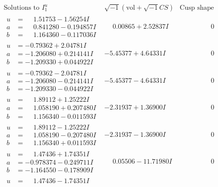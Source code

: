 \documentclass[1p]{elsarticle_modified}
\theoremstyle{definition}
\newcommand{\I}{\sqrt{-1}}
\begin{document}
$$\begin{array}{c|c|c}
\text{Solutions to }I^u_{1}& \I (\text{vol} + \sqrt{-1}CS) & \text{Cusp shape}\\
 \hline 
\begin{aligned}
u &= \phantom{-}1.51753 - 1.56254 I \\
a &= \phantom{-}0.841280 - 0.194857 I \\
b &= \phantom{-}1.164360 - 0.117036 I\end{aligned}
 & \phantom{-}0.00865 + 2.52837 I & \phantom{-0.000000 } 0 \\ \hline\begin{aligned}
u &= -0.79362 + 2.04781 I \\
a &= -1.206080 + 0.214141 I \\
b &= -1.209330 + 0.044922 I\end{aligned}
 & -5.45377 + 4.64331 I & \phantom{-0.000000 } 0 \\ \hline\begin{aligned}
u &= -0.79362 - 2.04781 I \\
a &= -1.206080 - 0.214141 I \\
b &= -1.209330 - 0.044922 I\end{aligned}
 & -5.45377 - 4.64331 I & \phantom{-0.000000 } 0 \\ \hline\begin{aligned}
u &= \phantom{-}1.89112 + 1.25222 I \\
a &= \phantom{-}1.058190 + 0.207480 I \\
b &= \phantom{-}1.156340 - 0.011593 I\end{aligned}
 & -2.31937 + 1.36900 I & \phantom{-0.000000 } 0 \\ \hline\begin{aligned}
u &= \phantom{-}1.89112 - 1.25222 I \\
a &= \phantom{-}1.058190 - 0.207480 I \\
b &= \phantom{-}1.156340 + 0.011593 I\end{aligned}
 & -2.31937 - 1.36900 I & \phantom{-0.000000 } 0 \\ \hline\begin{aligned}
u &= \phantom{-}1.47436 + 1.74351 I \\
a &= -0.978374 - 0.249711 I \\
b &= -1.164550 - 0.178909 I\end{aligned}
 & \phantom{-}0.05506 - 11.71980 I & \phantom{-0.000000 } 0 \\ \hline\begin{aligned}
u &= \phantom{-}1.47436 - 1.74351 I \\

\end{aligned}
\end{array}$$
\end{document}
